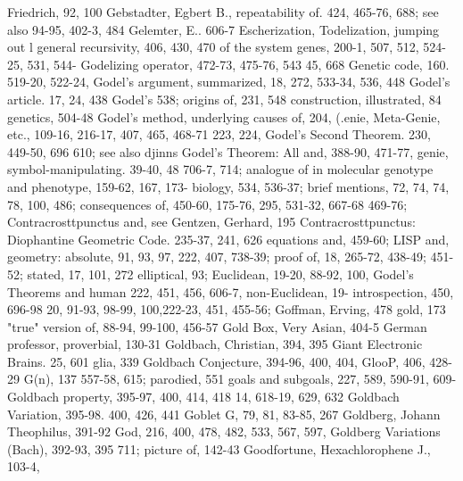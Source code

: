 Friedrich, 92, 100 Gebstadter, Egbert B.,       repeatability of. 424, 465-76, 688; see also
94-95, 402-3, 484 Gelemter, E.. 606-7           Escherization, Todelization, jumping out l
general recursivity, 406, 430, 470              of the system
genes, 200-1, 507, 512, 524-25, 531, 544-       Godelizing operator, 472-73, 475-76, 543
45, 668 Genetic code, 160. 519-20, 522-24,      Godel's argument, summarized, 18, 272,
533-34, 536,                                    448 Godel's article. 17, 24, 438 Godel's
538; origins of, 231, 548                       construction, illustrated, 84
genetics, 504-48                                Godel's method, underlying causes of, 204,
(.enie, Meta-Genie, etc., 109-16, 216-17,       407, 465, 468-71
223, 224,                                       Godel's Second Theorem. 230, 449-50, 696
610; see also djinns                            Godel's Theorem: All and, 388-90, 471-77,
genie, symbol-manipulating. 39-40, 48           706-7, 714; analogue of in molecular
genotype and phenotype, 159-62, 167, 173-       biology, 534, 536-37; brief mentions, 72,
74,                                             74, 78, 100, 486; consequences of, 450-60,
175-76, 295, 531-32, 667-68                     469-76; Contracrosttpunctus and, see
Gentzen, Gerhard, 195                           Contracrosttpunctus:             Diophantine
Geometric Code. 235-37, 241, 626                equations and, 459-60; LISP and,
geometry: absolute, 91, 93, 97, 222, 407,       738-39; proof of, 18, 265-72, 438-49;
451-52;                                         stated, 17, 101, 272
elliptical, 93; Euclidean, 19-20, 88-92, 100,   Godel's       Theorems        and     human
222, 451, 456, 606-7, non-Euclidean, 19-        introspection, 450, 696-98
20, 91-93, 98-99, 100,222-23, 451, 455-56;      Goffman, Erving, 478 gold, 173
"true" version of, 88-94, 99-100, 456-57        Gold Box, Very Asian, 404-5
German professor, proverbial, 130-31            Goldbach, Christian, 394, 395
Giant Electronic Brains. 25, 601 glia, 339      Goldbach Conjecture, 394-96, 400, 404,
GlooP, 406, 428-29 G(n), 137                    557-58, 615; parodied, 551
goals and subgoals, 227, 589, 590-91, 609-      Goldbach property, 395-97, 400, 414, 418
14, 618-19, 629, 632                            Goldbach Variation, 395-98. 400, 426, 441
Goblet G, 79, 81, 83-85, 267                    Goldberg, Johann Theophilus, 391-92
God, 216, 400, 478, 482, 533, 567, 597,         Goldberg Variations (Bach), 392-93, 395
711; picture of, 142-43                         Goodfortune, Hexachlorophene J., 103-4,
